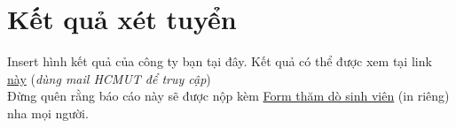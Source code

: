 \section{Kết quả xét tuyển }
Insert hình kết quả của công ty bạn tại đây. Kết quả có thể được xem tại link \href{https://drive.google.com/drive/u/1/folders/1WY1-qFcrsiqiFtSjrSmL5bGh9wd1GulV}{này} (\textit{dùng mail HCMUT để truy cập})
\\ Đừng quên rằng báo cáo này sẽ được nộp kèm \href{https://drive.google.com/drive/u/1/folders/1KR1yhCCZYzp2QifAMwU5VtFU5_aP-F6y}{Form thăm dò sinh viên} (in riêng) nha mọi người. 